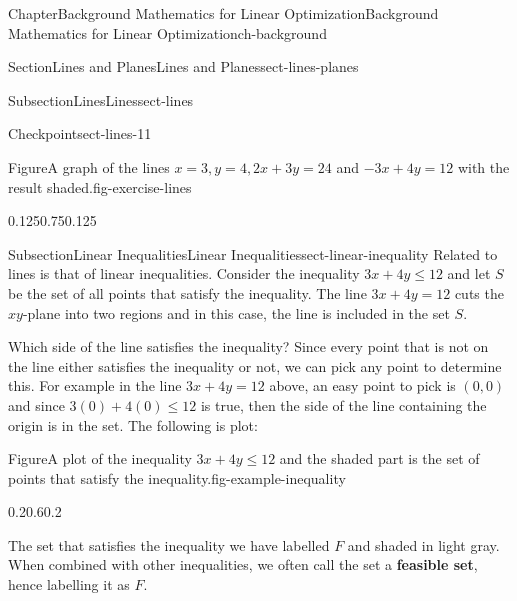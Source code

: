 \documentclass[oneside,10pt,]{book}
\newcommand{\terminology}[1]{\textbf{#1}}
\numberwithin{equation}{section}
\begin{document}
\begin{chapterptx}{Chapter}{Background Mathematics for Linear Optimization}{}{Background Mathematics for Linear Optimization}{}{}{ch-background}
\begin{sectionptx}{Section}{Lines and Planes}{}{Lines and Planes}{}{}{sect-lines-planes}
\begin{subsectionptx}{Subsection}{Lines}{}{Lines}{}{}{sect-lines}
\begin{inlineexercise}{Checkpoint}{}{sect-lines-11}
\begin{figureptx}{Figure}{A graph of the lines \(x=3, y=4, 2x+3y=24\) and \(-3x+4y = 12\) with the result shaded.}{fig-exercise-lines}{}
\begin{image}{0.125}{0.75}{0.125}{}
{\begin{tikzpicture}[scale=0.5]
\end{tikzpicture}%
}%
\end{image}%
\tcblower
\end{figureptx}%
\end{inlineexercise}%
\end{subsectionptx}
%
%
\typeout{************************************************}
\typeout{************************************************}
%
\begin{subsectionptx}{Subsection}{Linear Inequalities}{}{Linear Inequalities}{}{}{sect-linear-inequality}
Related to lines is that of linear inequalities. Consider the inequality \(3x+ 4y \leq 12\) and let \(S\) be the set of all points that satisfy the inequality. The line \(3x+4y=12\) cuts the \(xy\)-plane into two regions and in this case, the line is included in the set \(S\).%
\par
Which side of the line satisfies the inequality? Since every point that is not on the line either satisfies the inequality or not, we can pick any point to determine this. For example in the line \(3x+4y=12\) above, an easy point to pick is \((0,0)\) and since \(3(0)+4(0) \leq 12\) is true, then the side of the line containing the origin is in the set. The following is plot:%
\begin{figureptx}{Figure}{A plot of the inequality \(3x+4y \leq 12\) and the shaded part is the set of points that satisfy the inequality.}{fig-example-inequality}{}%
\begin{image}{0.2}{0.6}{0.2}{}%
%
\end{image}%
\tcblower
\end{figureptx}%
The set that satisfies the inequality we have labelled \(F\) and shaded in light gray. When combined with other inequalities, we often call the set a \terminology{feasible set}, hence labelling it as \(F\).%

\end{subsectionptx}
\end{sectionptx}
\end{chapterptx}
\end{document}
